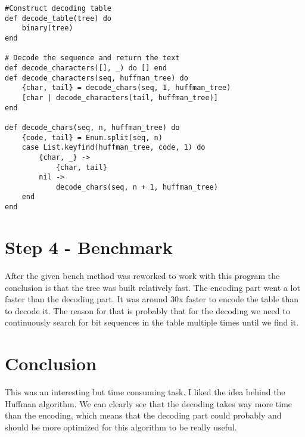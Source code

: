 \documentclass[a4paper,11pt]{article}
\begin{document}
\begin{verbatim}  
#Construct decoding table
def decode_table(tree) do
    binary(tree)
end

# Decode the sequence and return the text
def decode_characters([], _) do [] end
def decode_characters(seq, huffman_tree) do
    {char, tail} = decode_chars(seq, 1, huffman_tree)
    [char | decode_characters(tail, huffman_tree)]
end

def decode_chars(seq, n, huffman_tree) do
    {code, tail} = Enum.split(seq, n)
    case List.keyfind(huffman_tree, code, 1) do
        {char, _} ->
            {char, tail}
        nil ->
            decode_chars(seq, n + 1, huffman_tree)
    end
end
\end{verbatim}

\section{Step 4 - Benchmark}
After the given bench method was reworked to work with this program the conclusion is that the tree was built relatively fast. The encoding part went a lot faster than the decoding part. It was around 30x faster to encode the table than to decode it. The reason for that is probably that for the decoding we need to continuously search for bit sequences in the table multiple times until we find it.

\section{Conclusion}
This was an interesting but time consuming task. I liked the idea behind the Huffman algorithm. We can clearly see that the decoding takes way more time than the encoding, which means that the decoding part could probably and should be more optimized for this algorithm to be really useful.
\end{document}
